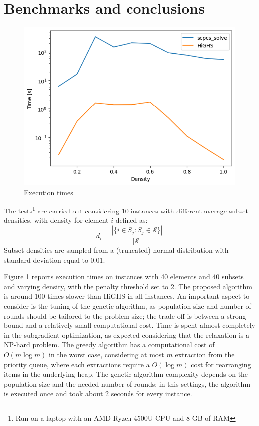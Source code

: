 \documentclass[a4paper]{article}
\begin{document}
\section{Benchmarks and conclusions}

\begin{figure}
	\centering
	\includegraphics[width=0.6\columnwidth]{benchmark.png}
	\caption{Execution times}
	\label{fig:benchmark}
\end{figure}

The tests\footnote{Run on a laptop with an AMD Ryzen 4500U CPU and 8 GB of RAM} are carried out considering 10 instances with different average subset densities, with density for element $i$ defined as:
$$
d_i = \frac{|\{i \in S_j : S_j \in \mathcal{S}\}|}{|\mathcal{S}|}
$$
Subset densities are sampled from a (truncated) normal distribution with standard deviation equal to 0.01.

Figure \ref{fig:benchmark} reports execution times on instances with 40 elements and 40 subsets and varying density, with the penalty threshold set to 2. The proposed algorithm is around 100 times slower than HiGHS in all instances. An important aspect to consider is the tuning of the genetic algorithm, as population size and number of rounds should be tailored to the problem size; the trade-off is between a strong bound and a relatively small computational cost.
Time is spent almost completely in the subgradient optimization, as expected considering that the relaxation is a NP-hard problem. The greedy algorithm has a computational cost of $O(m \log m)$ in the worst case, considering at most $m$ extraction from the priority queue, where each extractions require a $O(\log m)$ cost for rearranging items in the underlying heap. The genetic algorithm complexity depends on the population size and the needed number of rounds; in this settings, the algorithm is executed once and took about 2 seconds for every instance.



\printbibliography
\end{document}

